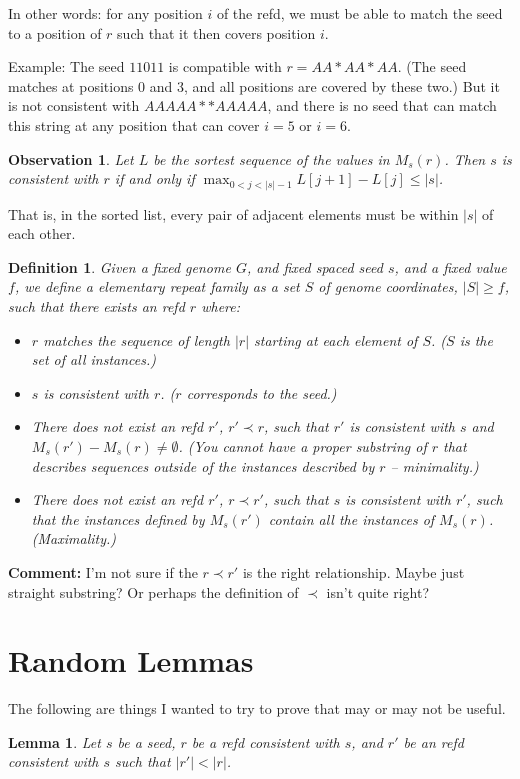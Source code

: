 \documentclass{article}
\newtheorem{definition}{Definition}
\newtheorem{observation}{Observation}
\newtheorem{lemma}{Lemma}
\begin{document}
In other words: for any position $i$ of the refd, we must be able to
match the seed to a position of $r$ such that it then covers position
$i$.

Example: The seed $11011$ is compatible with $r=AA*AA*AA$.  (The seed
matches at positions 0 and 3, and all positions are covered by these
two.)  But it is not consistent with $AAAAA**AAAAA$, and there is no
seed that can match this string at any position that can cover $i=5$
or $i=6$.

\begin{observation}
  Let $L$ be the sortest sequence of the values in $M_s(r)$.  Then $s$
  is consistent with $r$ if and only if $\max_{0 < j < |s|-1} L[j+1]-L[j] \leq |s|$.
\end{observation}
That is, in the sorted list, every pair of adjacent elements must be
within $|s|$ of each other.

\begin{definition}
  Given a fixed genome $G$, and fixed spaced seed
  $s$, and a fixed value $f$, we define a elementary repeat family as
  a set $S$ of genome coordinates, $|S| \geq f$, such that there
  exists an refd $r$ where:
  \begin{itemize}
  \item $r$ matches the sequence of length $|r|$ starting at each
    element of $S$.  ($S$ is the set of all instances.)
  \item $s$ is consistent with $r$.  ($r$ corresponds to the seed.)
  \item There does not exist an refd $r'$, $r' \prec r$,  such that $r'$
    is consistent with $s$ and $M_s(r') - M_s(r) \neq \emptyset$.  (You
    cannot have a proper substring of $r$ that describes sequences
    outside of the instances described by $r$ -- minimality.)
  \item There does not exist an refd $r'$, $r \prec r'$, such that $s$ is consistent
    with $r'$, such that the instances defined by $M_s(r')$ contain all the
    instances of $M_s(r)$.  (Maximality.)
  \end{itemize}
\end{definition}
 {\bf Comment:} I'm not sure if the $r \prec r'$ is the right
 relationship.  Maybe just straight substring?  Or perhaps the
 definition of $\prec$ isn't quite right?
 
  
\section{Random Lemmas}

The following are things I wanted to try to prove that may or may not
be useful.

\begin{lemma}
  Let $s$ be a seed, $r$ be a refd consistent with $s$,
  and $r'$ be an refd consistent with $s$ such that $|r'| < |r|$.  
\end{lemma}
\end{document}
